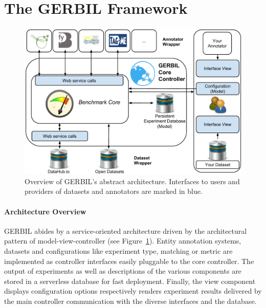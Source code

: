 \section{The GERBIL Framework}
\label{sec:architecture}
\begin{figure}[tb]
\centering
\includegraphics[width=\linewidth]{part_02/benchmarking/WWW_GERBIL/GERBIL_new_architectur}
\caption{Overview of GERBIL's abstract architecture. Interfaces to users and providers of datasets and annotators are marked in blue.
}
\label{fig:architecture}
\end{figure}


\paragraph{Architecture Overview}
GERBIL abides by a service-oriented architecture driven by the architectural pattern of model-view-controller (see Figure~\ref{fig:architecture}).
Entity annotation systems, datasets and configurations like experiment type, matching or metric are implemented as controller interfaces easily pluggable to the core controller. 
The output of experiments as well as descriptions of the various components are stored in a serverless database for fast deployment. %
Finally, the view component displays configuration options respectively renders experiment results delivered by the main controller communication with the diverse interfaces and the database.

